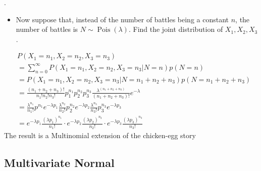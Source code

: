 \documentclass[8pt]{beamer}
\newcommand{\Pois}[1]{\operatorname{Pois}(#1)}
\begin{document}
\begin{frame}{.}
    \begingroup
        \begin{itemize}
            \item Now suppose that, instead of the number of battles being a constant $n$, the number of battles is $N \sim \Pois{\lambda}$. Find the joint distribution of $X_1, X_2, X_3$.
        \end{itemize}
    \endgroup

    \[
    \begin{aligned}
        &P(X_1=n_1, X_2=n_2, X_3=n_3) \\
        &= \sum_{n=0}^\infty P(X_1=n_1, X_2=n_2, X_3=n_3 | N=n)p(N=n) \\
        &=P(X_1=n_1, X_2=n_2, X_3=n_3 | N=n_1+n_2+n_3)p(N=n_1+n_2+n_3) \\
        &=\frac{(n_1 + n_2 + n_3)!}{n_1! n_2! n_3!} p_1^{n_1} p_2^{n_2} p_3^{n_3} \frac{\lambda^{(n_1 + n_2 + n_3)}}{(n_1 + n_2 + n_3)!} e^{-\lambda} \\
        &= \frac{\lambda^{n_1}}{n_1!} p^{n_1}e^{-\lambda p_1} \frac{\lambda^{n_2}}{n_2!} p_2^{n_2}e^{-\lambda p_2} \frac{\lambda^{n_3}}{n_3!} p_3^{n_3} e^{-\lambda p_3} \\
        &= e^{-\lambda p_1} \frac{(\lambda p_1)^{n_1}}{n_1!} \cdot e^{-\lambda p_2} \frac{(\lambda p_2)^{n_2}}{n_2!} \cdot e^{-\lambda p_3} \frac{(\lambda p_3)^{n_3}}{n_3!}
    \end{aligned}
    \]
    The result is a Multinomial extension of the chicken-egg story
\end{frame}

\subsection{Multivariate Normal}
\end{document}
